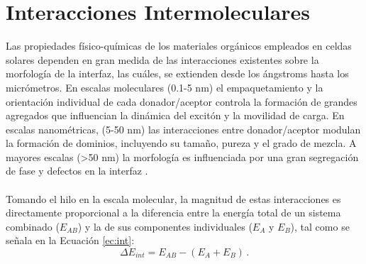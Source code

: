\titleformat{\chapter}[display]
  {\normalfont\bfseries}{}{0pt}{\Large} %
\chapter{Interacciones Intermoleculares}
Las propiedades físico-químicas de los materiales orgánicos empleados en celdas solares dependen en gran medida de las interacciones existentes sobre la morfología de la interfaz, las cuáles, se extienden desde los ángstroms hasta los micrómetros. En escalas moleculares (0.1-5 nm) el empaquetamiento y la orientación individual de cada donador/aceptor controla la formación de grandes agregados que influencian la dinámica del excitón y la movilidad de carga. En escalas nanométricas, (5-50 nm) las interacciones entre donador/aceptor modulan la formación de dominios, incluyendo su tamaño, pureza y el grado de mezcla. A mayores escalas (>50 nm) la morfología es influenciada por una gran segregación de fase y defectos en la interfaz \cite{kilbride2026organic}. \\ \\
Tomando el hilo en la escala molecular, la magnitud de estas interacciones es directamente proporcional a la diferencia entre la energía total de un sistema combinado ($E_{AB}$) y la de sus componentes individuales ($E_A$ y $E_B$), tal como se señala en la Ecuación \ref{ec:int}:
\begin{equation}
\Delta E_{int}=E_{AB}-(E_A+E_B) \label{ec:int} \, .
\end{equation}
